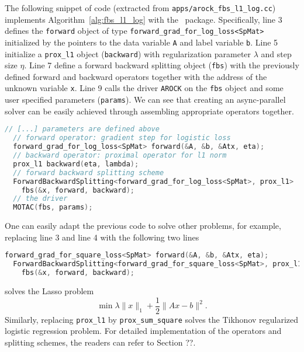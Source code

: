 The following snippet of code (extracted from 
\texttt{apps/arock\_fbs\_l1\_log.cc}) implements Algorithm~\ref{alg:fbs_l1_log} with the \pkg~package. 
Specifically, line 3 defines the \texttt{forward} object of type \texttt{forward\_grad\_for\_log\_loss<SpMat>} 
initialized by the pointers to the data variable \texttt{A} and label variable \texttt{b}. Line 5  initialize a 
\texttt{prox\_l1} object (\texttt{backward}) with regularization parameter $\lambda$ and step size $\eta$. 
Line 7 define a forward backward splitting object (\texttt{fbs}) with the previously defined forward and 
backward operators together with the address of the unknown variable \texttt{x}. Line 9 calls the driver 
\texttt{AROCK} on the \texttt{fbs} object and some user specified parameters (\texttt{params}). We can see
that creating an async-parallel solver can be easily achieved through assembling appropriate operators together.  
\begin{lstlisting}[language=C++]
  // [...] parameters are defined above
  // forward operator: gradient step for logistic loss
  forward_grad_for_log_loss<SpMat> forward(&A, &b, &Atx, eta);
  // backward operator: proximal operator for l1 norm 
  prox_l1 backward(eta, lambda);
  // forward backward splitting scheme
  ForwardBackwardSplitting<forward_grad_for_log_loss<SpMat>, prox_l1>
    fbs(&x, forward, backward);  
  // the driver
  MOTAC(fbs, params);  
\end{lstlisting}
One can easily adapt the previous code to solve other problems, for example, replacing line 3 and line 4 with
the following two lines
\begin{lstlisting}[language=C++]
  forward_grad_for_square_loss<SpMat> forward(&A, &b, &Atx, eta);
  ForwardBackwardSplitting<forward_grad_for_square_loss<SpMat>, prox_l1>
    fbs(&x, forward, backward);  
\end{lstlisting}
solves the Lasso problem
$$\min \lambda \|x\|_1 + \frac{1}{2} \|A x - b\|^2.$$
Similarly, replacing \texttt{prox\_l1} by \texttt{prox\_sum\_square} solves the Tikhonov regularized logistic regression problem.
For detailed implementation of the operators and splitting schemes, the readers can refer to Section ??.
